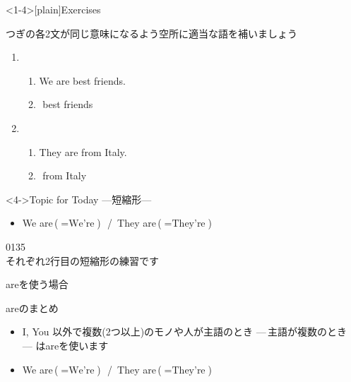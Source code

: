 \documentclass[aspectratio=169,xcolor={dvipsnames,table}]{beamer}
\begin{document}
%
%
\begin{frame}<1-4>[plain]{Exercises}

 {\small つぎの各2文が同じ意味になるよう空所に適当な語を補いましょう}

\begin{enumerate}
 \item \begin{enumerate}
	\item We are best friends.
	\item {}\,\,best friends
       \end{enumerate}
 \item \begin{enumerate}
	\item They are from Italy.
	\item {}\,\,from Italy        \end{enumerate}
\end{enumerate}

\begin{block}<4->{Topic for Today ---短縮形---}
\begin{itemize}[square]
 \item We are\,($=\text{We're}$)\,\,\,\,/\,\,\,They are\,($=\text{They're}$)
\end{itemize}
     \end{block}


\hfill{\tiny 0135}\,{\scriptsize {}}\\
\hfill{\scriptsize それぞれ2行目の短縮形の練習です}

\end{frame}
\begin{frame}[plain]{areを使う場合}

\begin{block}{areのまとめ}
\begin{itemize}[square]
 \item   I, You 以外で複数(2つ以上)のモノや人が主語のとき\,\,---\,主語が複数のとき\,---\,\,はareを使います
 \item We are\,($=\text{We're}$)\,\,\,\,/\,\,\,They are\,($=\text{They're}$)
\end{itemize}  
     \end{block}


\end{frame}
\end{document}
